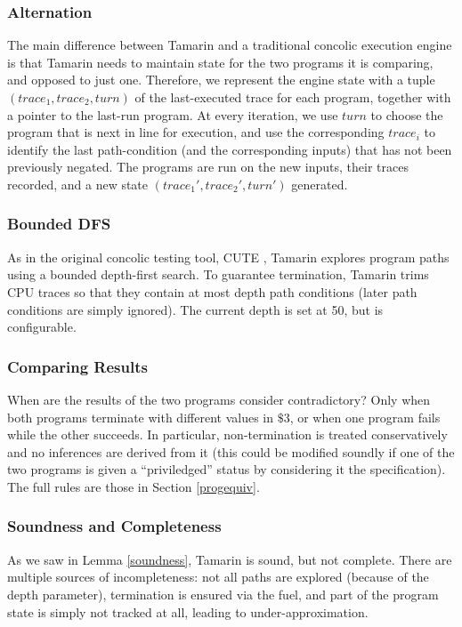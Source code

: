 \documentclass{llncs}
\begin{document}
\subsubsection{Alternation}

The main difference between Tamarin and a traditional concolic execution engine is that Tamarin needs to maintain state for the two programs it is comparing, and opposed to just one. Therefore, we represent the engine state with a tuple $(trace_1, trace_2, turn)$ of the last-executed trace for each program, together with a pointer to the last-run program. At every iteration, we use $turn$ to choose the program that is next in line for execution, and use the corresponding $trace_i$ to identify the last path-condition (and the corresponding inputs) that has not been previously negated. The programs are run on the new inputs, their traces recorded, and a new state $(trace_1', trace_2', turn')$ generated.

\subsubsection{Bounded DFS}

As in the original concolic testing tool, CUTE \cite{sen2005cute}, Tamarin explores program paths using a bounded depth-first search. To guarantee termination, Tamarin trims CPU traces so that they contain at most \textsf{depth} path conditions (later path conditions are simply ignored). The current depth is set at 50, but is configurable. 

\subsubsection{Comparing Results}

When are the results of the two programs consider contradictory? Only when both programs terminate with different values in $\$3$, or when one program fails while the other succeeds. In particular, non-termination is treated conservatively and no inferences are derived from it (this could be modified soundly if one of the two programs is given a ``priviledged'' status by considering it the specification). The full rules are those in Section \ref{progequiv}.

\subsubsection{Soundness and Completeness}

As we saw in Lemma \ref{soundness}, Tamarin is sound, but not complete. There are multiple sources of incompleteness: not all paths are explored (because of the \textsf{depth} parameter), termination is ensured via the \textsf{fuel}, and part of the program state is simply not tracked at all, leading to under-approximation.
\end{document}
